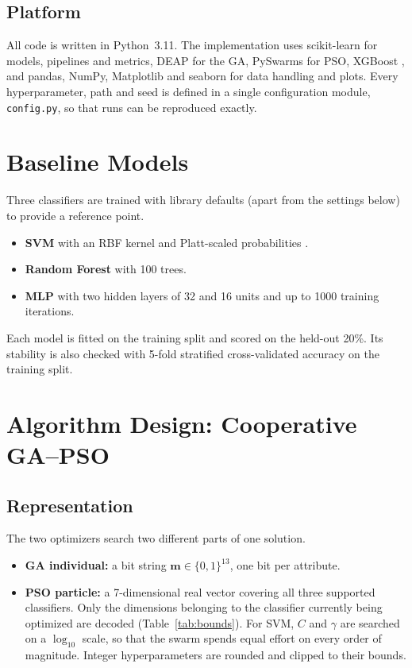 \documentclass[MTech]{ugthesis}
\begin{document}
\subsection{Platform}
All code is written in Python~3.11. The implementation uses scikit-learn \citep{pedregosa2011sklearn} for models, pipelines and metrics, DEAP \citep{fortin2012deap} for the GA, PySwarms \citep{miranda2018pyswarms} for PSO, XGBoost \citep{chen2016xgboost}, and pandas, NumPy, Matplotlib and seaborn for data handling and plots. Every hyperparameter, path and seed is defined in a single configuration module, \texttt{config.py}, so that runs can be reproduced exactly.

\section{Baseline Models}
Three classifiers are trained with library defaults (apart from the settings below) to provide a reference point.
\begin{itemize}
\item \textbf{SVM} \citep{cortes1995svm} with an RBF kernel and Platt-scaled probabilities \citep{platt1999probabilistic}.
\item \textbf{Random Forest} \citep{breiman2001rf} with 100 trees.
\item \textbf{MLP} \citep{rumelhart1986backprop} with two hidden layers of 32 and 16 units and up to 1000 training iterations.
\end{itemize}
Each model is fitted on the training split and scored on the held-out 20\%. Its stability is also checked with 5-fold stratified cross-validated accuracy on the training split.

\section{Algorithm Design: Cooperative GA--PSO}
\subsection{Representation}
The two optimizers search two different parts of one solution.
\begin{itemize}
\item \textbf{GA individual:} a bit string $\mathbf{m}\in\{0,1\}^{13}$, one bit per attribute.
\item \textbf{PSO particle:} a 7-dimensional real vector covering all three supported classifiers. Only the dimensions belonging to the classifier currently being optimized are decoded (Table~\ref{tab:bounds}). For SVM, $C$ and $\gamma$ are searched on a $\log_{10}$ scale, so that the swarm spends equal effort on every order of magnitude. Integer hyperparameters are rounded and clipped to their bounds.
\end{itemize}
\end{document}
